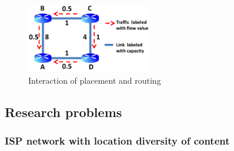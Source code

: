 \begin{figure}
\centerline{\includegraphics[height=1.2in]{ncdnpaper/ncdn-example}}\vspace*{-0.1in}
\caption{Interaction of placement and routing}
\vspace*{-0.2in}
\label{fig:NetworkExample}
\end{figure}



%
%
%
%
%
%
%



\subsection{Research problems}

\subsubsection{ISP network with location diversity of content}

